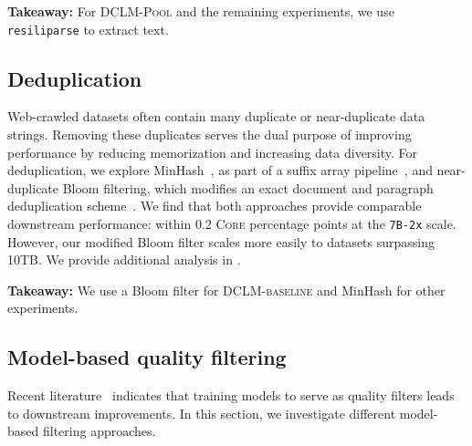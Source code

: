 \documentclass{article}
\newcommand{\takeawaybox}[1]{%
  \begin{tcolorbox}[
    colback=blue!10,
    colframe=blue!50,
    boxrule=0.5pt,
    arc=0mm,
    left=5pt,
    right=5pt,
    top=2pt,
    bottom=2pt,
    fontupper={\fontsize{9.5pt}{11.75pt}\selectfont}
  ]
    \textbf{Takeaway:} #1
  \end{tcolorbox}%
  \vspace*{-0.1cm}
}
\newcommand{\rawpool}{\textsc{DCLM-Pool}\xspace}
\newcommand{\hqpool}{\textsc{DCLM-baseline}\xspace}
\newcommand{\strack}{\texttt{1B-1x}\xspace}
\newcommand{\xltrack}{\texttt{7B-2x}\xspace}
\newcommand{\rw}{\texttt{RefinedWeb}\xspace}
\newcommand{\trafilatura}{\texttt{trafilatura}\xspace}
\newcommand{\resiliparse}{\texttt{resiliparse}\xspace}
\newcommand{\fasttext}{\texttt{fastText}\xspace}
\newcommand{\lowvar}{\textsc{Core}\xspace}
\newcommand{\commoncrawl}{Common Crawl\xspace}
\begin{document}
\takeawaybox{For \rawpool and the remaining experiments, we use \resiliparse{} to extract text.}

\begin{table}[t]
\centering
\caption{\textbf{Comparison of text extractors} (\strack{} scale). We apply three approaches for text extraction from HTML, process their output using the \rw{} heuristic filters, and evaluate the models trained on the resulting datasets. We find stricter extractors such as \resiliparse and \trafilatura are superior to WET files provided by \commoncrawl.}
\label{tab:html_extraction}

\end{table}

\subsection{Deduplication}
\label{sec:dedup}
Web-crawled datasets often contain many duplicate or near-duplicate data strings.
Removing these duplicates serves the dual purpose of improving performance by reducing memorization \citep{carlini2023quantifying, Lee2021DeduplicatingTD} and increasing data diversity.
%
For deduplication, we explore MinHash~\citep{minhash}, as part of a suffix array pipeline~\citep{Lee2021DeduplicatingTD, refinedweb}, and near-duplicate Bloom filtering, which modifies an exact document and paragraph deduplication scheme~\citep{soldaini2024dolma}.
We find that both approaches provide comparable downstream performance: within 0.2 \lowvar percentage points at the \xltrack scale.
However, our modified Bloom filter scales more easily to datasets surpassing 10TB.
We provide additional analysis in .

\takeawaybox{We use a Bloom filter for \hqpool and MinHash for other experiments.}

\subsection{Model-based quality filtering}
\label{sec:quality_filtering}
Recent literature~\citep{fang2023dfn,soldaini2024dolma, brandfonbrener2024color} indicates that training models to serve as quality filters leads to downstream improvements.
In this section, we investigate different model-based filtering approaches.

\begin{table}[t]
\centering
\caption{\textbf{Quality filtering comparison} (\strack scale). We evaluate various choices for model-based quality filters. Training a \fasttext classifier for filtering performs best.}
\label{tab:quality_filtering}

\end{table}
\end{document}
